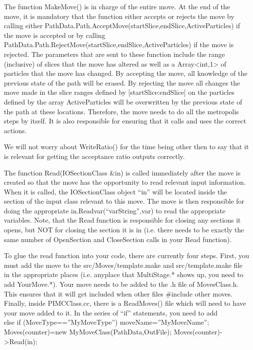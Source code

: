 \documentclass{book}
\begin{document}
The function MakeMove() is in charge of the entire move.  At the end
of the move, it is mandatory that the function either accepts or
rejects the move by calling either
PathData.Path.AcceptMove(startSlice,endSlice,ActiveParticles) if the
move is accepted or by calling 
PathData.Path.RejectMove(startSlice,endSlice,ActiveParticles) if the
move is rejected.  The parameters that are sent to these function
include the range (inclusive) of slices that the move has altered as
well as a Array<int,1> of particles that the move has changed.  By
accepting the move, all knowledge of the previous state of the path
will be erased. By rejecting the move all changes the move made in the
slice ranges defined by [startSlice:endSlice] on the particles defined
by the array ActiveParticles will be overwritten by the previous state
of the path at these locations.  Therefore, the move needs to do all
the metropolis steps by itself. It is also responsible for ensuring
that it calls and uses the correct actions.

We will not worry about WriteRatio() for the time being other then to
say that it is relevant for getting the acceptance ratio outputs
correctly.

The function Read(IOSectionClass &in) is called immediately after the
move is created so that the move has the opportunity to read relevant
input information.  When it is called, the IOSectionClass object
``in'' will be located inside the section of the input class relevant
to this move.  The move is then responsible for doing the appropriate
in.Readvar(``varString'',var) to read the appropriate variables. Note,
that the Read function is responsible for closing any sections it
opens, but NOT for closing the section it is in (i.e. there needs to
be exactly the same number of OpenSection and CloseSection calls in
your Read function).

To glue the read function into your code, there are currently four
steps. First, you must add the move to the src/Moves/template.make and
src/template.make file in the appropriate places (i.e. anyplace that
MultiStage.* shows up, you need to add YourMove.*).  Your move needs
to be added to the .h file of MovesClass.h. This ensures that it will
get included when other files #include other moves. Finally, inside
PIMCClass.cc, there is a ReadMoves() file which will need to have your
move added to it.  In the series of ``if'' statements, you need to add
\\
    else if (MoveType==''MyMoveType''){
      moveName=''MyMoveName'';
      Moves(counter)=new MyMoveClass(PathData,OutFile);
      Moves(counter)->Read(in);
    }
\end{document}
